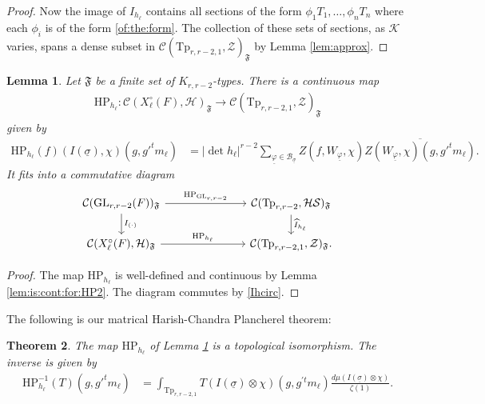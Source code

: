 \documentclass[12pt]{amsart}
\newtheorem{thm}{Theorem}[section]
\newtheorem{lem}[thm]{Lemma}
\theoremstyle{remark}
\numberwithin{equation}{section}
\newcommand{\GL}{\mathrm{GL}}
\newcommand{\lto}{\longrightarrow}
\theoremstyle{definition}
\numberwithin{equation}{subsection}
\begin{document}
\begin{proof}
Now the image of $\widehat{I}_{h_\ell}$ contains all sections of the form $\phi_1 T_1,\dots,\phi_nT_n$ where each $\phi_i$ is of the form \eqref{of:the:form}.  The collection of these sets of sections, as $\mathcal{K}$ varies, spans a dense subset in $\mathcal{C}(\mathrm{Tp}_{r,r-2,1},\mathcal{Z})_{\mathfrak{F}}$ by Lemma \ref{lem:approx}.  
\end{proof}



\begin{lem} \label{lem:commute}
Let $\mathfrak{F}$ be a finite set of $K_{r,r-2}$-types.
There is a continuous map 
\begin{align*}
\mathrm{HP}_{h_\ell}:    \mathcal{C}(X^\circ_{\ell}(F),\mathcal{H})_{\mathfrak{F}} \lto \mathcal{C}(\mathrm{Tp}_{r,r-2,1},\mathcal{Z})_{\mathfrak{F}}
\end{align*}
given by
\begin{align*}
\mathrm{HP}_{h_\ell}(f)(I(\underline{\sigma}),\chi)(g,g'^tm_\ell)&=|\det h_\ell|^{r-2}\sum_{\underline{\varphi} \in \mathcal{B}_{\underline{\sigma}}}
        Z(f,W_{\underline{\varphi}},\chi)\overline{Z(W_{\underline{\varphi}},\chi)(g,g'^tm_{\ell})}.
\end{align*}
It fits into a commutative diagram
\begin{equation} \label{diag:for:proof}
\begin{tikzcd}
\mathcal{C}(\GL_{r,r-2}(F))_{\mathfrak{F}}\arrow[d,"I_{(\cdot)}"] \arrow[rrr,"\mathrm{HP}_{\GL_{r,r-2}}"] & &&\mathcal{C}(\mathrm{Tp}_{r,r-2},\mathcal{HS})_{\mathfrak{F}}\arrow[d,"\widehat{I}_{h_\ell}"]\\
\mathcal{C}(X_{\ell}^\circ(F),\mathcal{H})_{\mathfrak{F}}   \arrow[rrr,"\mathrm{HP}_{h_\ell}"] &&&\mathcal{C}(\mathrm{Tp}_{r,r-2,1},\mathcal{Z})_{\mathfrak{F}}.
\end{tikzcd}
\end{equation}
\end{lem}


\begin{proof}
The map $\mathrm{HP}_{h_\ell}$ is well-defined and continuous by Lemma \ref{lem:is:cont:for:HP2}. The diagram commutes by \eqref{Ihcirc}.
\end{proof}


The following is our matrical Harish-Chandra Plancherel theorem:




\begin{thm} \label{thm:PW:Z} 
The map $\mathrm{HP}_{h_\ell}$ of Lemma \ref{lem:commute} is a topological isomorphism.  
The inverse is given by 
\begin{align*}
 \mathrm{HP}^{-1}_{h_\ell}(T)(g,g'^tm_{\ell})&=\int_{\mathrm{Tp}_{r,r-2,1}} T(I(\underline{\sigma}) \otimes \chi)(g,g^{\prime t}m_{\ell})\frac{d\mu(I(\underline{\sigma})\otimes \chi)}{\zeta(1)}.
 \end{align*}
\end{thm}
\end{document}
